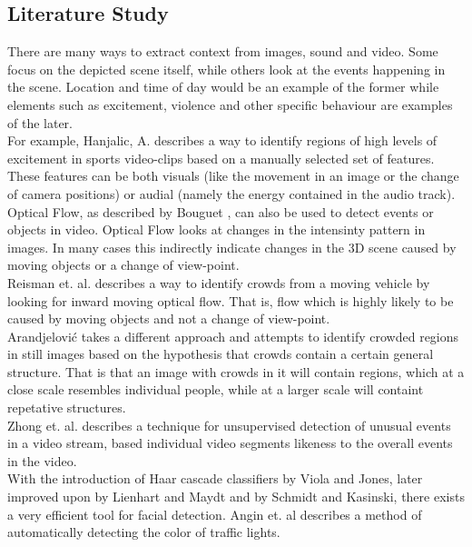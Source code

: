 \subsection{Literature Study}
%
%
There are many ways to extract context from images, sound and video. Some focus on the depicted scene itself, while others look at the events happening in the scene. Location and time of day would be an example of the former while elements such as excitement, violence and other specific behaviour are examples of the later.\\
For example, Hanjalic, A. \cite{citeulike:405480} describes a way to identify regions of high levels of excitement in sports video-clips based on a manually selected set of features. These features can be both visuals (like the movement in an image or the change of camera positions) or audial (namely the energy contained in the audio track).\\
Optical Flow, as described by Bouguet \cite{Bouguet2000}, can also be used to detect events or objects in video. Optical Flow looks at changes in the intensinty pattern in images. In many cases this indirectly indicate changes in the 3D scene caused by moving objects or a change of view-point.\\
Reisman et. al. \cite{CrowdDetectionInVideoSequences} describes a way to identify crowds from a moving vehicle by looking for inward moving optical flow. That is, flow which is highly likely to be caused by moving objects and not a change of view-point.\\
Arandjelović \cite{Arandjelovic08crowddetection} takes a different approach and attempts to identify crowded regions in still images based on the hypothesis that crowds contain a certain general structure. That is that an image with crowds in it will contain regions, which at a close scale resembles individual people, while at a larger scale will containt repetative structures.\\
Zhong et. al. \cite{10.1109/CVPR.2004.78} describes a technique for unsupervised detection of unusual events in a video stream, based individual video segments likeness to the overall events in the video.
\\
%
With the introduction of Haar cascade classifiers by Viola and Jones\cite{viola01}, later improved upon by Lienhart and Maydt\cite{lienhart01} and by Schmidt and Kasinski\cite{schmidt01}\cite{schmidt02}, there exists a very efficient tool for facial detection.
%
%
%
Angin et. al \cite{10.1109/MDM.2010.71} describes a method of automatically detecting the color of traffic lights.
%
%
